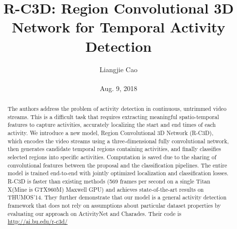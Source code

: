 \documentclass[10pt,twocolumn,letterpaper]{article}
\begin{document}
\title{\textbf{R-C3D: Region Convolutional 3D Network for Temporal Activity Detection}}
\author{Liangjie Cao\\\\ Aug. 9, 2018}
\maketitle
\begin{abstract}
The authors address the problem of activity detection in continuous, untrimmed video streams. This is a difficult task that requires extracting meaningful spatio-temporal features to capture activities, accurately localizing the start and end times of each activity. We introduce a new model, Region Convolutional 3D Network (R-C3D), which encodes the video streams using a three-dimensional fully convolutional network, then generates candidate temporal regions containing activities, and finally classifies selected regions into specific activities. Computation is saved due to the sharing of convolutional features between the proposal and
the classification pipelines. The entire model is trained end-to-end with jointly optimized localization and classification losses. R-C3D is faster than existing methods (569 frames per second on a single Titan X(Mine is GTX960M) Maxwell GPU) and achieves state-of-the-art results on THUMOS'14. They further demonstrate that our model is a general activity detection framework that does not rely on assumptions about particular dataset properties by evaluating our approach on ActivityNet and Charades. Their code is \url{http://ai.bu.edu/r-c3d/}
\end{abstract}
\end{document}
